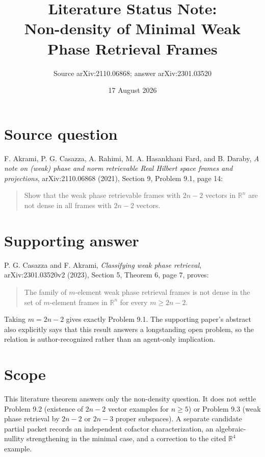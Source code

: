 \documentclass[11pt]{article}
\title{Literature Status Note:\\
Non-density of Minimal Weak Phase Retrieval Frames}
\author{Source arXiv:2110.06868; answer arXiv:2301.03520}
\date{17 August 2026}
\newcommand{\R}{\mathbb{R}}
\begin{document}
\maketitle

\begin{center}
\end{center}

\section*{Source question}

F. Akrami, P. G. Casazza, A. Rahimi, M. A. Hasankhani Fard, and B. Daraby,
\emph{A note on (weak) phase and norm retrievable Real Hilbert space frames
and projections}, arXiv:2110.06868 (2021), Section 9, Problem 9.1, page 14:
\begin{quote}
Show that the weak phase retrievable frames with $2n-2$ vectors in $\R^n$
are not dense in all frames with $2n-2$ vectors.
\end{quote}

\section*{Supporting answer}

P. G. Casazza and F. Akrami, \emph{Classifying weak phase retrieval},
arXiv:2301.03520v2 (2023), Section 5, Theorem 6, page 7, proves:
\begin{quote}
The family of $m$-element weak phase retrieval frames is not dense in the set
of $m$-element frames in $\R^n$ for every $m\geq2n-2$.
\end{quote}
Taking $m=2n-2$ gives exactly Problem 9.1.  The supporting paper's abstract
also explicitly says that this result answers a longstanding open problem, so
the relation is author-recognized rather than an agent-only implication.

\section*{Scope}

This literature theorem answers only the non-density question.  It does not
settle Problem 9.2 (existence of $2n-2$ vector examples for $n\geq5$) or
Problem 9.3 (weak phase retrieval by $2n-2$ or $2n-3$ proper subspaces).
A separate candidate partial packet records an independent cofactor
characterization, an algebraic-nullity strengthening in the minimal case, and
a correction to the cited $\R^4$ example.
\end{document}
